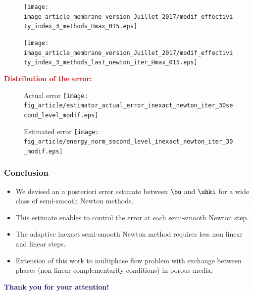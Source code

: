 \documentclass[10 pt]{beamer}
\begin{document}
\begin{frame}
\begin{figure}
\begin{minipage}[c]{.38\linewidth}
   \centering
\texttt{[image: image\_article\_membrane\_version\_Juillet\_2017/modif\_effectivity\_index\_3\_methods\_Hmax\_015.eps]}    
\end{minipage}\hfill
\begin{minipage}[c]{.38\linewidth}
   \centering
\texttt{[image: image\_article\_membrane\_version\_Juillet\_2017/modif\_effectivity\_index\_3\_methods\_last\_newton\_iter\_Hmax\_015.eps]}     
\end{minipage}\hfill
\end{figure}

\textcolor{red}{\textbf{Distribution of the error:}}
\begin{figure}[H]
\begin{minipage}[c]{.40\linewidth}
   \centering
   Actual error
\texttt{[image: fig\_article/estimator\_actual\_error\_inexact\_newton\_iter\_30second\_level\_modif.eps]}    
\end{minipage}\hfill
\begin{minipage}[c]{.40\linewidth}
   \centering
   Estimated error
\texttt{[image: fig\_article/energy\_norm\_second\_level\_inexact\_newton\_iter\_30\_modif.eps]}     
\end{minipage}\hfill
\end{figure}



\end{frame}
\begin{frame}
\frametitle{Conclusion}
\begin{itemize}
\item
We devised an a posteriori error estimate between $\bu$ and $\uhki$ for a wide class of semi-smooth Newton methods.
\vspace{0.5 cm}

\item 
This estimate enables to control the error at each semi-smooth Newton step.
\vspace{0.5 cm}
\item
The adaptive inexact semi-smooth Newton method requires less non linear and linear steps. 
\vspace{0.5 cm}
\item
Extension of this work to  multiphase flow problem with exchange between phases (non linear complementarity conditions) in porous media.  
\end{itemize}
\vspace{1 cm}
\Large
\hspace{1.8 cm}
\textcolor{midnightblue}
{\textbf{
Thank you for your attention!}}
\end{frame}
\end{document}
